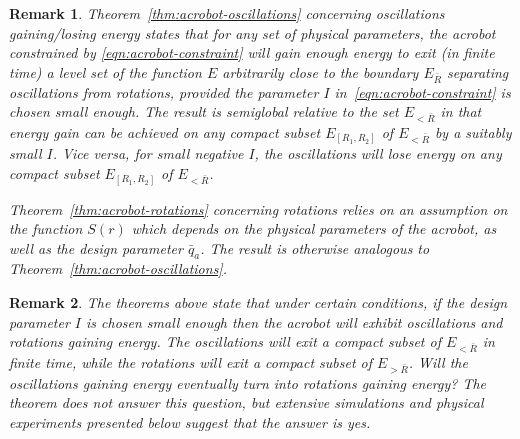 \documentclass[journal,twoside,web, twocolumn,draftcls]{ieeecolor}
\newtheorem{rem}{Remark}
\newcommand*{\cP}{\mathcal{P}}
\begin{document}
\begin{rem}
Theorem~\ref{thm:acrobot-oscillations} concerning oscillations
gai\-ning/lo\-sing energy states that for any set of physical parameters, the
acrobot constrained by
\eqref{eqn:acrobot-constraint} will gain enough energy to exit (in finite time) a
level set of the function $E$ arbitrarily close to the boundary $E_{\bar R}$
separating oscillations from rotations, provided the parameter $I$
in~\eqref{eqn:acrobot-constraint} is chosen small enough. The result is
semiglobal relative to the set $E_{<\bar R}$ in that energy gain can be achieved
on any compact subset $E_{[R_1,R_2]}$ of $E_{<\bar R}$ by a suitably small $I$.
Vice versa, for small {\em negative} $I$, the oscillations will lose energy on any compact subset $E_{[R_1,R_2]}$ of $E_{<\bar R}$.

Theorem~\ref{thm:acrobot-rotations} concerning rotations relies on an assumption on the function $S(r)$ which depends on the physical parameters of the acrobot, as well as the design parameter $\bar q_a$. The result is otherwise analogous to Theorem~\ref{thm:acrobot-oscillations}.
\end{rem}

\begin{rem}\label{rem:thm:caveat}
The theorems above state that under certain conditions, if the design parameter $I$ is chosen small enough then the acrobot will exhibit oscillations and rotations gaining energy. The oscillations will exit a compact subset of $E_{<\bar R}$ in finite time, while the rotations will exit a compact subset of $E_{>\bar R}$. Will the oscillations gaining energy eventually turn into rotations gaining energy? The theorem does not answer this question, but extensive simulations and physical experiments presented below suggest that the answer is yes. 
\end{rem}
%
%
%
%

\end{document}
